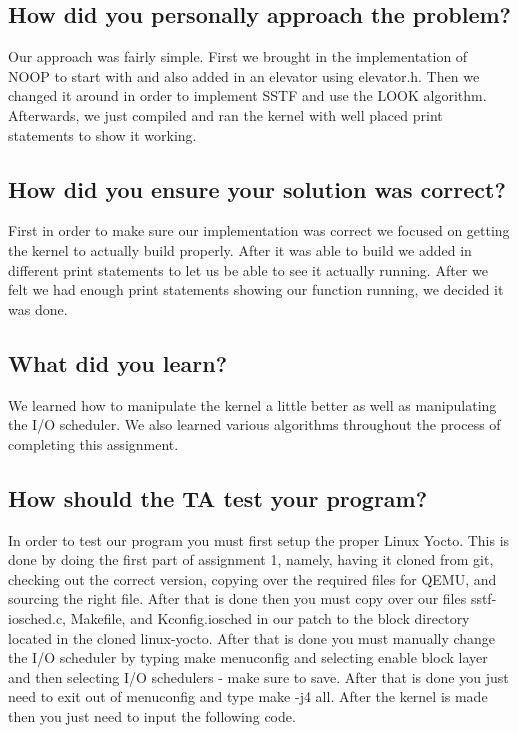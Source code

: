 \documentclass[10pt,letterpaper,onecolumn,draftclsnofoot]{IEEEtran}
\begin{document}
\subsection{How did you personally approach the problem?}
Our approach was fairly simple.
First we brought in the implementation of NOOP to start with and also added in an elevator using elevator.h.
Then we changed it around in order to implement SSTF and use the LOOK algorithm.
Afterwards, we just compiled and ran the kernel with well placed print statements to show it working.

\subsection{How did you ensure your solution was correct?}
First in order to make sure our implementation was correct we focused on getting the kernel to actually build properly.
After it was able to build we added in different print statements to let us be able to see it actually running.
After we felt we had enough print statements showing our function running, we decided it was done.

\subsection{What did you learn?}
We learned how to manipulate the kernel a little better as well as manipulating the I/O scheduler.
We also learned various algorithms throughout the process of completing this assignment.

\subsection{How should the TA test your program?}
In order to test our program you must first setup the proper Linux Yocto.
This is done by doing the first part of assignment 1, namely, having it cloned from git, checking out the correct version, copying over the required files for QEMU, and sourcing the right file.
After that is done then you must copy over our files sstf-iosched.c, Makefile, and Kconfig.iosched in our patch to the block directory located in the cloned linux-yocto.
After that is done you must manually change the I/O scheduler by typing make menuconfig and selecting enable block layer and then selecting I/O schedulers - make sure to save.
After that is done you just need to exit out of menuconfig and type make -j4 all.
After the kernel is made then you just need to input the following code.
\end{document}
